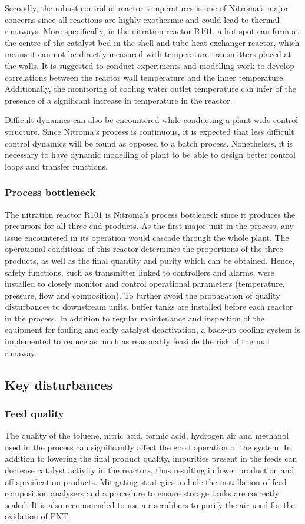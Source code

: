 Secondly, the robust control of reactor temperatures is one of Nitroma's major concerns since all reactions are highly exothermic and could lead to thermal runaways. More specifically, in the nitration reactor R101, a hot spot can form at the centre of the catalyst bed in the shell-and-tube heat exchanger reactor, which means it can not be directly measured with temperature transmitters placed at the walls. It is suggested to conduct experiments and modelling work to develop correlations between the reactor wall temperature and the inner temperature. Additionally, the monitoring of cooling water outlet temperature can infer of the presence of a significant increase in temperature in the reactor.

Difficult dynamics can also be encountered while conducting a plant-wide control structure. Since Nitroma's process is continuous, it is expected that less difficult control dynamics will be found as opposed to a batch process. Nonetheless, it is necessary to have dynamic modelling of plant to be able to design better control loops and transfer functions.


\subsubsection{Process bottleneck} %
The nitration reactor R101 is Nitroma's process bottleneck since it produces the precursors for all three end products. As the first major unit in the process, any issue encountered in its operation would cascade through the whole plant. The operational conditions of this reactor determines the proportions of the three products, as well as the final quantity and purity which can be obtained. Hence, safety functions, such as transmitter linked to controllers and alarms, were installed to closely monitor and control operational parameters (temperature, pressure, flow and composition). To further avoid the propagation of quality disturbances to downstream units, buffer tanks are installed before each reactor in the process. In addition to regular maintenance and inspection of the equipment for fouling and early catalyst deactivation, a back-up cooling system is implemented to reduce as much as reasonably feasible the risk of thermal runaway.


\subsection{Key disturbances} %
\label{sec:quality}
\subsubsection{Feed quality}
The quality of the toluene, nitric acid, formic acid, hydrogen air and methanol used in the process can significantly affect the good operation of the system. In addition to lowering the final product quality, impurities present in the feeds can decrease catalyst activity in the reactors, thus resulting in lower production and off-specification products. Mitigating strategies include the installation of feed composition analysers and a procedure to ensure storage tanks are correctly sealed. It is also recommended to use air scrubbers to purify the air used for the oxidation of PNT.

